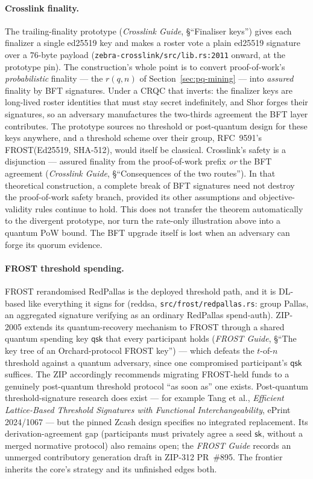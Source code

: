 \documentclass[11pt,a4paper]{article}
\theoremstyle{definition}
\begin{document}
\paragraph{Crosslink finality.} The trailing-finality prototype
(\emph{Crosslink Guide}, \S``Finaliser keys'') gives each finalizer a
single ed25519 key and makes a roster vote a plain ed25519 signature
over a $76$-byte payload (\texttt{zebra-crosslink/src/lib.rs:2011}
onward, at the prototype pin). The construction's whole point is to
convert proof-of-work's \emph{probabilistic} finality --- the $r(q, n)$
of Section~\ref{sec:pq-mining} --- into \emph{assured} finality by BFT
signatures. Under a CRQC that inverts: the finalizer keys are long-lived
roster identities that must stay secret indefinitely, and Shor forges
their signatures, so an adversary manufactures the two-thirds agreement
the BFT layer contributes. The prototype sources no threshold or
post-quantum design for these keys anywhere, and a threshold scheme
over their group, RFC~9591's \textsf{FROST}(Ed25519, SHA-512), would
itself be classical.
Crosslink's safety is a disjunction --- assured finality from the
proof-of-work prefix \emph{or} the BFT agreement (\emph{Crosslink
Guide}, \S``Consequences of the two routes''). In that
theoretical construction, a complete break of BFT signatures need not
destroy the proof-of-work safety branch, provided its other assumptions
and objective-validity rules continue to hold. This does not transfer
the theorem automatically to the divergent prototype, nor turn the
rate-only illustration above into a quantum PoW bound. The BFT upgrade
itself is lost when an adversary can forge its quorum evidence.

\paragraph{FROST threshold spending.} FROST rerandomised RedPallas is
the deployed threshold path, and it is DL-based like everything it
signs for (\textsf{reddsa}, \texttt{src/frost/redpallas.rs}: group
Pallas, an aggregated signature verifying as an ordinary RedPallas
spend-auth). ZIP-2005 extends its quantum-recovery mechanism to FROST
through a shared quantum spending key $\mathsf{qsk}$ that every
participant holds (\emph{FROST Guide}, \S``The key tree of an
Orchard-protocol FROST key'') --- which defeats the $t$-of-$n$ threshold
against a quantum adversary, since one compromised participant's
$\mathsf{qsk}$ suffices. The ZIP accordingly recommends migrating
FROST-held funds to a genuinely post-quantum threshold protocol ``as
soon as'' one exists. Post-quantum threshold-signature research does
exist --- for example Tang et al., \emph{Efficient Lattice-Based
Threshold Signatures with Functional Interchangeability}, ePrint
2024/1067 --- but the pinned Zcash design specifies no integrated
replacement. Its derivation-agreement gap (participants must privately
agree a seed $\mathsf{sk}$, without a merged normative protocol) also
remains open; the \emph{FROST Guide} records an unmerged contributory
generation draft in ZIP-312 PR~\#895.
The frontier inherits the core's
strategy and its unfinished edges both.
\end{document}
